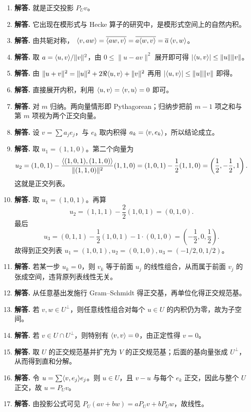 \begin{enumerate}[label=\textbf{\arabic*.}, leftmargin=*, itemsep=1em]
$P_U(1,0)=\inner{(1,0)}{e}e=(1/\sqrt2)e=(1/2,1/2)$。
\item \textbf{解答.} 就是正交投影 $P_Uv$。
\item \textbf{解答.} 它出现在模形式与 Hecke 算子的研究中，是模形式空间上的自然内积。
\item \textbf{解答.} 由共轭对称，
$\langle v, aw \rangle=\overline{\langle aw, v \rangle}=\overline{a\langle w, v \rangle}=\overline a\,\langle v, w \rangle$。
\item \textbf{解答.} 取 $a=\langle u, v \rangle/\|v\|^2$，由 $0\le\|u-av\|^2$ 展开即可得
$|\langle u, v \rangle|\le\|u\|\|v\|$。
\item \textbf{解答.} 由
$\|u+v\|^2=\|u\|^2+2\Re\langle u, v \rangle+\|v\|^2$
再用 $|\langle u, v \rangle|\le\|u\|\|v\|$ 即得。
\item \textbf{解答.} 直接展开内积，利用 $\langle u, v \rangle=\langle v, u \rangle=0$ 即可。
\item \textbf{解答.} 对 $m$ 归纳。两向量情形即 Pythagorean；归纳步把前 $m-1$ 项之和与第 $m$ 项视为两个正交向量。
\item \textbf{解答.} 设 $v=\sum a_je_j$，与 $e_k$ 取内积得 $a_k=\langle v, e_k \rangle$，所以结论成立。
\item \textbf{解答.} 取 $u_1=(1,1,0)$。第二个向量为
\[
u_2=(1,0,1)-\frac{\langle (1,0,1), (1,1,0) \rangle}{\|(1,1,0)\|^2}(1,1,0)=(1,0,1)-\frac12(1,1,0)=\left(\frac12,-\frac12,1\right).
\]
这就是正交列表。
\item \textbf{解答.} 取 $u_1=(1,0,1)$。再算
\[
u_2=(1,1,1)-\frac{2}{2}(1,0,1)=(0,1,0).
\]
最后
\[
u_3=(0,1,1)-\frac{1}{2}(1,0,1)-1\cdot(0,1,0)=\left(-\frac12,0,\frac12\right).
\]
故得到正交列表 $u_1=(1,0,1),u_2=(0,1,0),u_3=(-1/2,0,1/2)$。
\item \textbf{解答.} 若某一步 $u_k=0$，则 $v_k$ 等于前面 $u_j$ 的线性组合，从而属于前面 $v_j$ 的张成空间，违背原列表线性无关。
\item \textbf{解答.} 从任意基出发施行 Gram--Schmidt 得正交基，再单位化得正交规范基。
\item \textbf{解答.} 若 $v,w\in U^{\perp}$，则任意线性组合对每个 $u\in U$ 的内积仍为零，故为子空间。
\item \textbf{解答.} 若 $v\in U\cap U^{\perp}$，则特别有 $\langle v, v \rangle=0$，由正定性得 $v=0$。
\item \textbf{解答.} 取 $U$ 的正交规范基并扩充为 $V$ 的正交规范基；后面的基向量张成 $U^{\perp}$，从而得到直和分解。
\item \textbf{解答.} 令 $u=\sum\langle v, e_j \rangle e_j$。则 $u\in U$，且 $v-u$ 与每个 $e_k$ 正交，因此与整个 $U$ 正交，故 $u=P_Uv$。
\item \textbf{解答.} 由投影公式可见 $P_U(av+bw)=aP_Uv+bP_Uw$，故线性。

\end{enumerate}
